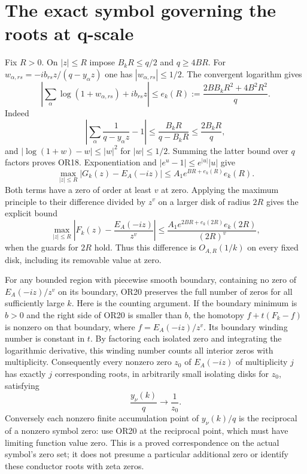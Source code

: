 \documentclass[11pt]{article}
\begin{document}
\section{The exact symbol governing the roots at q-scale}
Fix $R>0$. On $|z|\le R$ impose
$B_kR\le q/2$ and $q\ge4BR$. For
$w_{\alpha,rs}=-ib_{rs}z/(q-y_\alpha z)$ one has
$|w_{\alpha,rs}|\le1/2$. The convergent logarithm gives
\[
\left|\sum_\alpha\log(1+w_{\alpha,rs})+ib_{rs}z\right|
\le e_k(R):=\frac{2BB_kR^2+4B^2R^2}{q}.
\tag{OR18}
\]
Indeed
\[
\left|\sum_\alpha\frac1{q-y_\alpha z}-1\right|
\le\frac{B_kR}{q-B_kR}\le\frac{2B_kR}{q},
\]
and $|\log(1+w)-w|\le |w|^2$ for $|w|\le1/2$.
Summing the latter bound over $q$ factors proves OR18.
Exponentiation and $|e^u-1|\le e^{|u|}|u|$ give
\[
\max_{|z|\le R}|G_k(z)-E_A(-iz)|
\le A_1e^{BR+e_k(R)}e_k(R).
\tag{OR19}
\]
Both terms have a zero of order at least $v$ at zero. Applying
the maximum principle to their difference divided by $z^v$
on a larger disk of radius $2R$ gives the explicit bound
\[
\max_{|z|\le R}\left|F_k(z)-\frac{E_A(-iz)}{z^v}\right|
\le\frac{A_1e^{2BR+e_k(2R)}e_k(2R)}{(2R)^v},
\tag{OR20}
\]
when the guards for $2R$ hold. Thus this difference is
$O_{A,R}(1/k)$ on every fixed disk, including its removable value
at zero.

For any bounded region with piecewise smooth boundary, containing
no zero of $E_A(-iz)/z^v$ on its boundary, OR20 preserves the full
number of zeros for all sufficiently large $k$. Here is the
counting argument. If the boundary minimum is $b>0$ and the
right side of OR20 is smaller than $b$, the homotopy
$f+t(F_k-f)$ is nonzero on that boundary, where $f=E_A(-iz)/z^v$.
Its boundary winding number is constant in $t$. By factoring
each isolated zero and integrating the logarithmic derivative,
this winding number counts all interior zeros with multiplicity.
Consequently every nonzero zero $z_0$ of $E_A(-iz)$ of multiplicity
$j$ has exactly $j$ corresponding roots, in arbitrarily small
isolating disks for $z_0$, satisfying
\[
\boxed{\frac{y_\nu(k)}q\longrightarrow \frac1{z_0}.}
\tag{OR21}
\]
Conversely each nonzero finite accumulation point of $y_\nu(k)/q$
is the reciprocal of a nonzero symbol zero: use OR20 at the
reciprocal point, which must have limiting function value zero.
This is a proved correspondence on the actual symbol's zero set;
it does not presume a particular additional zero or identify
these conductor roots with zeta zeros.
\end{document}
